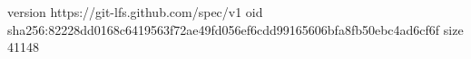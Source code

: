 version https://git-lfs.github.com/spec/v1
oid sha256:82228dd0168c6419563f72ae49fd056ef6cdd99165606bfa8fb50ebc4ad6cf6f
size 41148
